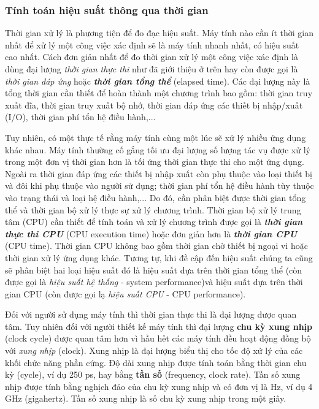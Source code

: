 \subsubsection{Tính toán hiệu suất thông qua thời gian}
Thời gian xử lý là phương tiện để đo đạc hiệu suất. Máy tính nào cần ít thời gian nhất để xử lý một công việc xác định sẽ là máy tính nhanh nhất, có hiệu suất cao nhất. Cách đơn giản nhất để đo thời gian xử lý một công việc xác định là dùng đại lượng \emph{thời gian thực thi} như đã giới thiệu ở trên hay còn được gọi là \emph{thời gian đáp ứng} hoặc \emph{\bfseries thời gian tổng thể} (elapsed time). Các đại lượng này là tổng thời gian cần thiết để hoàn thành một chương trình bao gồm: thời gian truy xuất đĩa, thời gian truy xuất bộ nhớ, thời gian đáp ứng các thiết bị nhập/xuất (I/O), thời gian phí tổn hệ điều hành,...

Tuy nhiên, có một thực tế rằng máy tính cùng một lúc sẽ xử lý nhiều ứng dụng khác nhau. Máy tính thường cố gắng tối ưu đại lượng số lượng tác vụ được xử lý trong một đơn vị thời gian hơn là tối ứng thời gian thực thi cho một ứng dụng. Ngoài ra thời gian đáp ứng các thiết bị nhập xuất còn phụ thuộc vào loại thiết bị và đôi khi phụ thuộc vào người sử dụng; thời gian phí tổn hệ điều hành tùy thuộc vào trạng thái và loại hệ điều hành,... Do đó, cần phân biệt được thời gian tổng thể và thời gian bộ xử lý thực sự xử lý chương trình. Thời gian bộ xử lý trung tâm (CPU) cần thiết để tính toán và xử lý chương trình được gọi là \emph{\bfseries thời gian thực thi CPU} (CPU execution time) hoặc đơn giản hơn là \emph{\bfseries thời gian CPU} (CPU time). Thời gian CPU không bao gồm thời gian chờ thiết bị ngoại vi hoặc thời gian xử lý ứng dụng khác. Tương tự, khi đề cập đến hiệu suất chúng ta cũng sẽ phân biệt hai loại hiệu suất đó là hiệu suất dựa trên thời gian tổng thể (còn được gọi là \emph{hiệu suất hệ thống} - system performance)và hiệu suất dựa trên thời gian CPU (còn được gọi lạ \emph{hiệu suất CPU} - CPU performance).

Đối với người sử dụng máy tính thì thời gian thực thi là đại lượng được quan tâm. Tuy nhiên đối với người thiết kế máy tính thì đại lượng \textbf{chu kỳ xung nhịp} (clock cycle) được quan tâm hơn vì hầu hết các máy tính đều hoạt động đồng bộ với \emph{xung nhịp} (clock). Xung nhịp là đại lượng biểu thị cho tốc độ xử lý của các khối chức năng phần cứng. Độ dài xung nhịp được tính toán bằng thời gian chu kỳ (cycle), ví dụ 250 ps, hay bằng \textbf{tần số} (frequency, clock rate). Tần số xung nhịp được tính bằng nghịch đảo của chu kỳ xung nhịp và có đơn vị là Hz, ví dụ 4 GHz (gigahertz). Tần số xung nhịp là số chu kỳ xung nhịp trong một giây.

